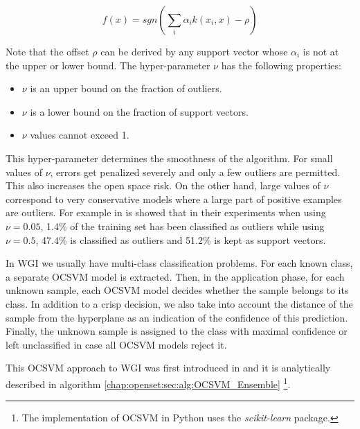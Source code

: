 \begin{equation}
    f(x) = sgn(\sum_i \alpha_i k(x_i,x) - \rho)
\end{equation}

Note that the offset $\rho$ can be derived by any support vector whose $\alpha_i$ is not at the upper or lower bound. The hyper-parameter $\nu$ has the following properties:

\begin{itemize}
	\item $\nu$ is an upper bound on the fraction of outliers.
	\item $\nu$ is a lower bound on the fraction of support vectors.
	\item $\nu$ values cannot exceed 1.
\end{itemize}

This hyper-parameter determines the smoothness of the algorithm. For small values of $\nu$, errors get penalized severely and only a few outliers are permitted. This also increases the open space risk. On the other hand, large values of $\nu$ correspond to very conservative models where a large part of  positive examples are outliers. For example in \parencite{scholkopf1999estimating} is showed that in their experiments when using $\nu=0.05$, 1.4\% of the training set has been classified as outliers while using $\nu=0.5$, 47.4\% is classified as outliers and 51.2\% is kept as support vectors.

In WGI we usually have multi-class classification problems. For each known class, a separate OCSVM model is extracted. Then, in the application phase, for each unknown sample, each OCSVM model decides whether the sample belongs to its class. In addition to a crisp decision, we also take into account the distance of the sample from the hyperplane as an indication of the confidence of this prediction. Finally, the unknown sample is assigned to the class with maximal confidence or left unclassified in case all OCSVM models reject it. 

This OCSVM approach to WGI was first introduced in \parencite{pritsos2013open} and it is analytically described in algorithm \ref{chap:openset:sec:alg:OCSVM_Ensemble} \footnote{The implementation of OCSVM in Python uses the \textit{scikit-learn} package.}.

